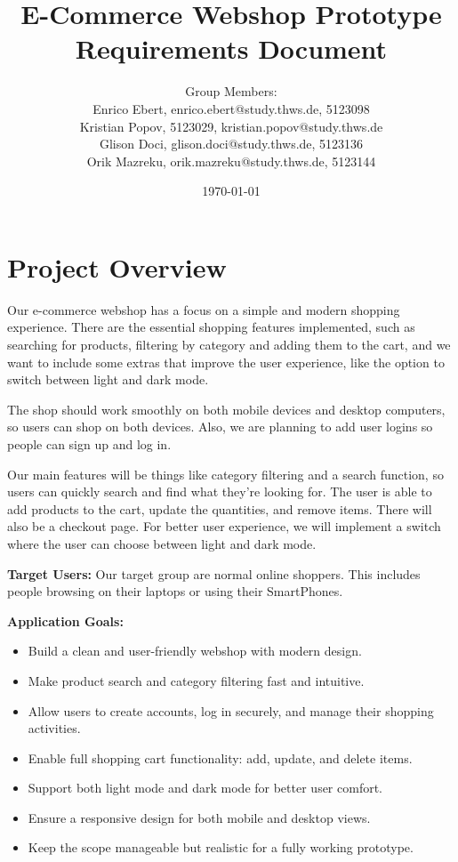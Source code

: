 \documentclass[a4paper,12pt]{article}
\title{E-Commerce Webshop Prototype \\
	Requirements Document}
\author{
	Group Members: \\
	Enrico Ebert, enrico.ebert@study.thws.de, 5123098 \\
	Kristian Popov, 5123029, kristian.popov@study.thws.de \\
	Glison Doci, glison.doci@study.thws.de, 5123136 \\
	Orik Mazreku, orik.mazreku@study.thws.de, 5123144
}
\date{\today}
\begin{document}
	
	\maketitle
	
\section{Project Overview}

Our e-commerce webshop has a focus on a simple and modern shopping experience. There are the essential shopping features implemented, such as searching for products, filtering by category and adding them to the cart, and we want to include some extras that improve the user experience, like the option to switch between light and dark mode.

The shop should work smoothly on both mobile devices and desktop computers, so users can shop on both devices. Also, we are planning to add user logins so people can sign up and log in.

Our main features will be things like category filtering and a search function, so users can quickly search and find what they’re looking for. The user is able to add products to the cart, update the quantities, and remove items. There will also be a checkout page. For better user experience, we will implement a switch where the user can choose between light and dark mode.

\textbf{Target Users: }  
Our target group are normal online shoppers. This includes people browsing on their laptops or using their SmartPhones.

\textbf{Application Goals:}
\begin{itemize}
	\item Build a clean and user-friendly webshop with modern design.
	\item Make product search and category filtering fast and intuitive.
	\item Allow users to create accounts, log in securely, and manage their shopping activities.
	\item Enable full shopping cart functionality: add, update, and delete items.
	\item Support both light mode and dark mode for better user comfort.
	\item Ensure a responsive design for both mobile and desktop views.
	\item Keep the scope manageable but realistic for a fully working prototype.
\end{itemize}
	
\end{document}
